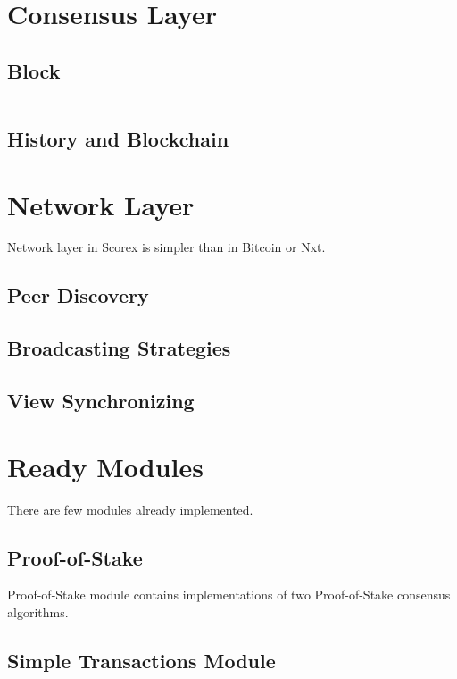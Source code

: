 \documentclass[]{report}   %
\begin{document}
\section{Consensus Layer}

\subsection{Block}

\begin{lstlisting}

\end{lstlisting}

\subsection{History and Blockchain}

\section{Network Layer}

Network layer in Scorex is simpler than in Bitcoin or Nxt. 

\subsection{Peer Discovery}

\subsection{Broadcasting Strategies}

\subsection{View Synchronizing}

\section{Ready Modules}
There are few modules already implemented.

\subsection{Proof-of-Stake}
Proof-of-Stake module contains implementations of two Proof-of-Stake consensus algorithms. 

\subsection{Simple Transactions Module}
\end{document}
